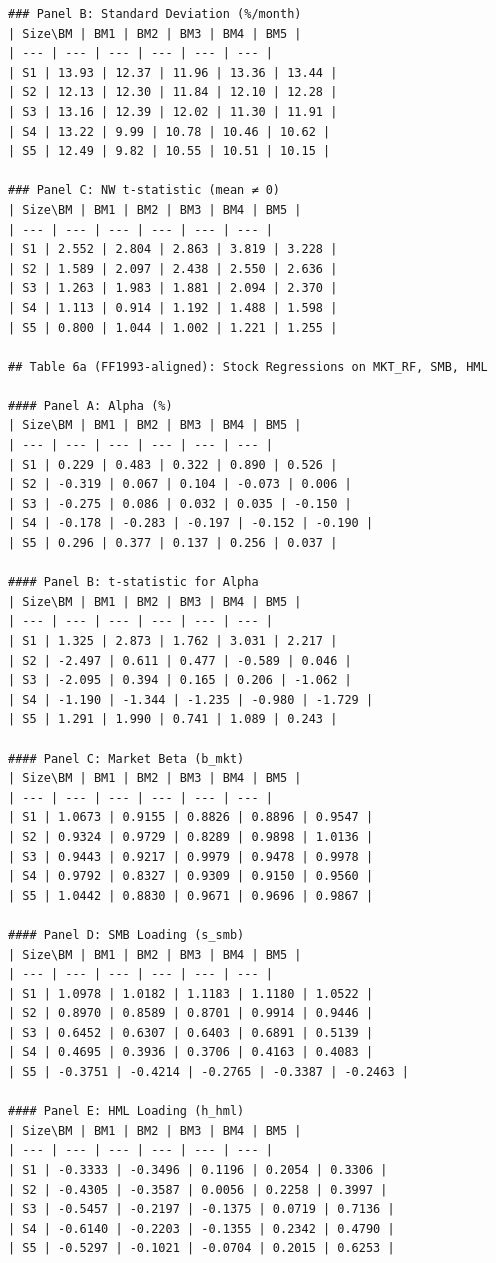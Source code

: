 \begin{verbatim}
### Panel B: Standard Deviation (%/month)
| Size\BM | BM1 | BM2 | BM3 | BM4 | BM5 |
| --- | --- | --- | --- | --- | --- |
| S1 | 13.93 | 12.37 | 11.96 | 13.36 | 13.44 |
| S2 | 12.13 | 12.30 | 11.84 | 12.10 | 12.28 |
| S3 | 13.16 | 12.39 | 12.02 | 11.30 | 11.91 |
| S4 | 13.22 | 9.99 | 10.78 | 10.46 | 10.62 |
| S5 | 12.49 | 9.82 | 10.55 | 10.51 | 10.15 |

### Panel C: NW t-statistic (mean ≠ 0)
| Size\BM | BM1 | BM2 | BM3 | BM4 | BM5 |
| --- | --- | --- | --- | --- | --- |
| S1 | 2.552 | 2.804 | 2.863 | 3.819 | 3.228 |
| S2 | 1.589 | 2.097 | 2.438 | 2.550 | 2.636 |
| S3 | 1.263 | 1.983 | 1.881 | 2.094 | 2.370 |
| S4 | 1.113 | 0.914 | 1.192 | 1.488 | 1.598 |
| S5 | 0.800 | 1.044 | 1.002 | 1.221 | 1.255 |

## Table 6a (FF1993-aligned): Stock Regressions on MKT_RF, SMB, HML

#### Panel A: Alpha (%)
| Size\BM | BM1 | BM2 | BM3 | BM4 | BM5 |
| --- | --- | --- | --- | --- | --- |
| S1 | 0.229 | 0.483 | 0.322 | 0.890 | 0.526 |
| S2 | -0.319 | 0.067 | 0.104 | -0.073 | 0.006 |
| S3 | -0.275 | 0.086 | 0.032 | 0.035 | -0.150 |
| S4 | -0.178 | -0.283 | -0.197 | -0.152 | -0.190 |
| S5 | 0.296 | 0.377 | 0.137 | 0.256 | 0.037 |

#### Panel B: t-statistic for Alpha
| Size\BM | BM1 | BM2 | BM3 | BM4 | BM5 |
| --- | --- | --- | --- | --- | --- |
| S1 | 1.325 | 2.873 | 1.762 | 3.031 | 2.217 |
| S2 | -2.497 | 0.611 | 0.477 | -0.589 | 0.046 |
| S3 | -2.095 | 0.394 | 0.165 | 0.206 | -1.062 |
| S4 | -1.190 | -1.344 | -1.235 | -0.980 | -1.729 |
| S5 | 1.291 | 1.990 | 0.741 | 1.089 | 0.243 |

#### Panel C: Market Beta (b_mkt)
| Size\BM | BM1 | BM2 | BM3 | BM4 | BM5 |
| --- | --- | --- | --- | --- | --- |
| S1 | 1.0673 | 0.9155 | 0.8826 | 0.8896 | 0.9547 |
| S2 | 0.9324 | 0.9729 | 0.8289 | 0.9898 | 1.0136 |
| S3 | 0.9443 | 0.9217 | 0.9979 | 0.9478 | 0.9978 |
| S4 | 0.9792 | 0.8327 | 0.9309 | 0.9150 | 0.9560 |
| S5 | 1.0442 | 0.8830 | 0.9671 | 0.9696 | 0.9867 |

#### Panel D: SMB Loading (s_smb)
| Size\BM | BM1 | BM2 | BM3 | BM4 | BM5 |
| --- | --- | --- | --- | --- | --- |
| S1 | 1.0978 | 1.0182 | 1.1183 | 1.1180 | 1.0522 |
| S2 | 0.8970 | 0.8589 | 0.8701 | 0.9914 | 0.9446 |
| S3 | 0.6452 | 0.6307 | 0.6403 | 0.6891 | 0.5139 |
| S4 | 0.4695 | 0.3936 | 0.3706 | 0.4163 | 0.4083 |
| S5 | -0.3751 | -0.4214 | -0.2765 | -0.3387 | -0.2463 |

#### Panel E: HML Loading (h_hml)
| Size\BM | BM1 | BM2 | BM3 | BM4 | BM5 |
| --- | --- | --- | --- | --- | --- |
| S1 | -0.3333 | -0.3496 | 0.1196 | 0.2054 | 0.3306 |
| S2 | -0.4305 | -0.3587 | 0.0056 | 0.2258 | 0.3997 |
| S3 | -0.5457 | -0.2197 | -0.1375 | 0.0719 | 0.7136 |
| S4 | -0.6140 | -0.2203 | -0.1355 | 0.2342 | 0.4790 |
| S5 | -0.5297 | -0.1021 | -0.0704 | 0.2015 | 0.6253 |


\end{verbatim}

